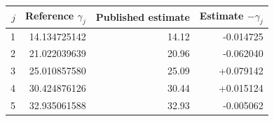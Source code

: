 \begin{tabular}{rrrr}
\toprule
$j$ & Reference $\gamma_j$ & Published estimate & Estimate $-\gamma_j$ \\
\midrule
1 & 14.134725142 & 14.12 & -0.014725 \\
2 & 21.022039639 & 20.96 & -0.062040 \\
3 & 25.010857580 & 25.09 & +0.079142 \\
4 & 30.424876126 & 30.44 & +0.015124 \\
5 & 32.935061588 & 32.93 & -0.005062 \\
\bottomrule
\end{tabular}
